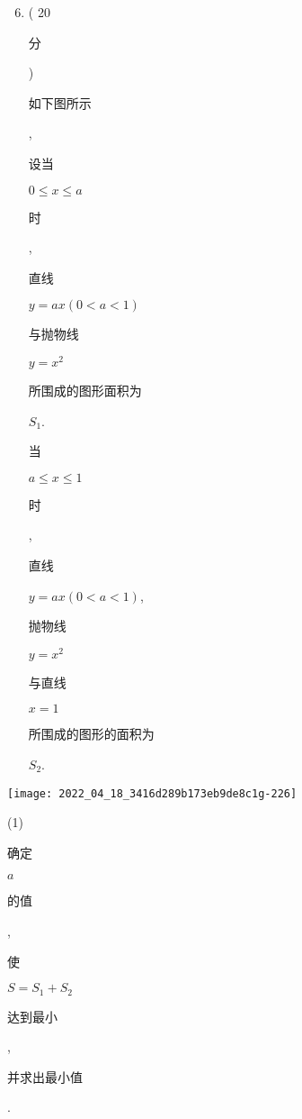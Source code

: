 \documentclass[10pt]{article}
\begin{document}
\begin{enumerate}
  \setcounter{enumi}{5}
  \item ( 20 \begin{CJK}{UTF8}{mj}分\end{CJK}) \begin{CJK}{UTF8}{mj}如下图所示\end{CJK}, \begin{CJK}{UTF8}{mj}设当\end{CJK} $0 \leq x \leq a$ \begin{CJK}{UTF8}{mj}时\end{CJK}, \begin{CJK}{UTF8}{mj}直线\end{CJK} $y=a x(0<a<1)$ \begin{CJK}{UTF8}{mj}与抛物线\end{CJK} $y=x^{2}$ \begin{CJK}{UTF8}{mj}所围成的图形面积为\end{CJK} $S_{1}$. \begin{CJK}{UTF8}{mj}当\end{CJK} $a \leq x \leq 1$ \begin{CJK}{UTF8}{mj}时\end{CJK}, \begin{CJK}{UTF8}{mj}直线\end{CJK} $y=a x(0<a<1)$, \begin{CJK}{UTF8}{mj}抛物线\end{CJK} $y=x^{2}$ \begin{CJK}{UTF8}{mj}与直线\end{CJK} $x=1$ \begin{CJK}{UTF8}{mj}所围成的图形的面积为\end{CJK} $S_{2}$.
\end{enumerate}
\texttt{[image: 2022\_04\_18\_3416d289b173eb9de8c1g-226]}

(1) \begin{CJK}{UTF8}{mj}确定\end{CJK} $a$ \begin{CJK}{UTF8}{mj}的值\end{CJK}, \begin{CJK}{UTF8}{mj}使\end{CJK} $S=S_{1}+S_{2}$ \begin{CJK}{UTF8}{mj}达到最小\end{CJK}, \begin{CJK}{UTF8}{mj}并求出最小值\end{CJK}.
\end{document}
